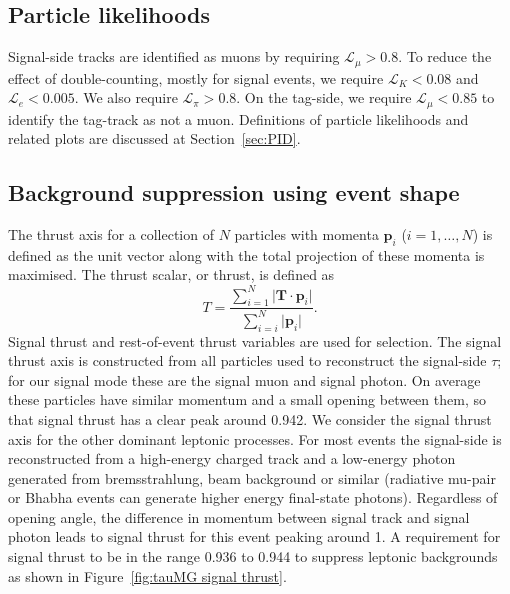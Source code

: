 \documentclass[12pt]{thesis}  %
\begin{document}
\subsection{Particle likelihoods}

Signal-side tracks are identified as muons by requiring $\mathcal{L}_{\mu} > 0.8$. To reduce the effect of double-counting, mostly for signal events, we require $\mathcal{L}_{K} < 0.08$ and $\mathcal{L}_{e} < 0.005$. We also require $\mathcal{L}_{\pi} > 0.8$. On the tag-side, we require $\mathcal{L}_{\mu} < 0.85$ to identify the tag-track as not a muon. Definitions of particle likelihoods and related plots are discussed at Section~\ref{sec:PID}.

\subsection{Background suppression using event shape}

The thrust axis for a collection of $N$ particles with momenta $\mathbf{p}_{i}$ ($i = 1,\ldots, N$) is defined as the unit vector along with the total projection of these momenta is maximised. The thrust scalar, or thrust, is defined as
\begin{equation}
T = \frac{\sum^N_{i=1}\lvert\mathbf{T}\cdot\mathbf{p}_i\rvert}{\sum^N_{i=i}\lvert\mathbf{p}_i\rvert}.
\end{equation}
Signal thrust and rest-of-event thrust variables are used for selection. The signal thrust axis is constructed from all particles used to reconstruct the signal-side $\tau$; for our signal mode these are the signal muon and signal photon. On average these particles have similar momentum and a small opening between them, so that signal thrust has a clear peak around \num{0.942}. We consider the signal thrust axis for the other dominant leptonic processes. For most events the signal-side is reconstructed from a high-energy charged track and a low-energy photon generated from bremsstrahlung, beam background or similar (radiative mu-pair or Bhabha events can generate higher energy final-state photons). Regardless of opening angle, the difference in momentum between signal track and signal photon leads to signal thrust for this event peaking around \num{1}. A requirement for signal thrust to be in the range \num{0.936} to \num{0.944} to suppress leptonic backgrounds as shown in Figure~\ref{fig:tauMG signal thrust}. 
\end{document}
